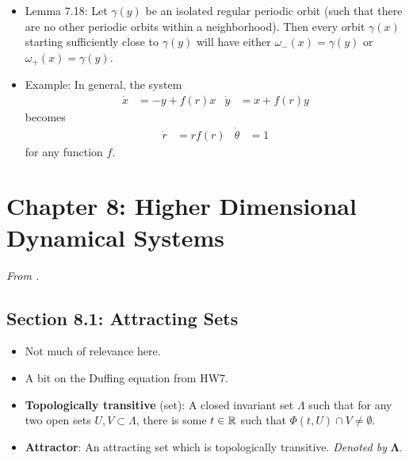 \documentclass[../notes.tex]{subfiles}
\begin{document}
\begin{itemize}
    \item Lemma 7.18: Let $\gamma(y)$ be an isolated regular periodic orbit (such that there are no other periodic orbits within a neighborhood). Then every orbit $\gamma(x)$ starting sufficiently close to $\gamma(y)$ will have either $\omega_-(x)=\gamma(y)$ or $\omega_+(x)=\gamma(y)$.
    \item Example: In general, the system
    \begin{align*}
        \dot{x} &= -y+f(r)x&
        \dot{y} &= x+f(r)y
    \end{align*}
    becomes
    \begin{align*}
        \dot{r} &= rf(r)&
        \dot{\theta} &= 1
    \end{align*}
    for any function $f$.
\end{itemize}



\section{Chapter 8: Higher Dimensional Dynamical Systems}
\emph{From \textcite{bib:Teschl}.}
\subsection*{Section 8.1: Attracting Sets}
\begin{itemize}
    \item Not much of relevance here.
    \item A bit on the Duffing equation from HW7.
    \item \textbf{Topologically transitive} (set): A closed invariant set $\Lambda$ such that for any two open sets $U,V\subset\Lambda$, there is some $t\in\mathbb{R}$ such that $\Phi(t,U)\cap V\neq\emptyset$.
    \item \textbf{Attractor}: An attracting set which is topologically transitive. \emph{Denoted by} $\bm{\Lambda}$.
\end{itemize}
\end{document}
